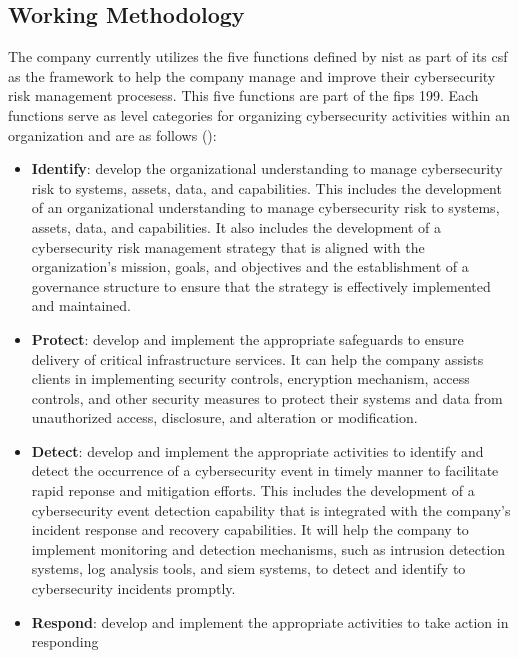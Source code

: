 \begin{multicols}{2}
      \subsection{Working Methodology}
      The company currently utilizes the five functions defined by \acrshort{nist} as part of its \acrshort{csf} as the framework
      to help the company manage and improve their cybersecurity risk management procesess. This five functions are part of the
      \acrshort{fips} 199. Each functions serve as level categories for organizing cybersecurity activities within an organization
      and are as follows (\cite{nist}):
      \begin{itemize}
            \item \textbf{Identify}: develop the organizational understanding to manage cybersecurity risk to systems, assets, data,
                  and capabilities. This includes the development of an organizational understanding to manage cybersecurity risk to systems,
                  assets, data, and capabilities. It also includes the development of a cybersecurity risk management strategy that is aligned
                  with the organization's mission, goals, and objectives and the establishment of a governance structure to ensure that the
                  strategy is effectively implemented and maintained.
            \item \textbf{Protect}: develop and implement the appropriate safeguards to ensure delivery of critical infrastructure services.
                  It can help the company assists clients in implementing security controls, encryption mechanism, access
                  controls, and other security measures to protect their systems and data from unauthorized access, disclosure,
                  and alteration or modification.
            \item \textbf{Detect}: develop and implement the appropriate activities to identify and detect the occurrence of a cybersecurity event
                  in timely manner to facilitate rapid reponse and mitigation efforts. This includes the development of a cybersecurity event
                  detection capability that is integrated with the company's incident response and recovery capabilities. It will
                  help the company to implement monitoring and detection mechanisms, such as intrusion detection systems, log analysis tools,
                  and \acrshort{siem} systems, to detect and identify to cybersecurity incidents promptly.
            \item \textbf{Respond}: develop and implement the appropriate activities to take action in responding

\end{itemize}
\end{multicols}
